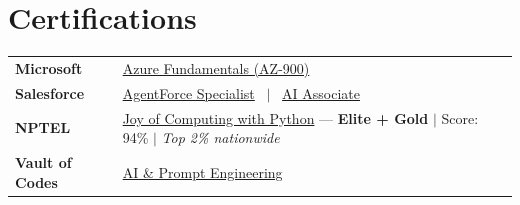 \documentclass[a4paper,10.5pt]{article}
\begin{document}
\section{Certifications}
\vspace{1pt}
\begin{tabularx}{\linewidth}{@{}l X@{}}
\textbf{Microsoft}      & \href{https://drive.google.com/file/d/1Uj9T80eRGSfT8G-HdICgMUi--92Ffz_9/view?usp=share_link}{Azure Fundamentals (AZ-900)} \\[2pt]
\textbf{Salesforce}     & \href{https://drive.google.com/file/d/1ig8ZAgni9Ml1-eQw-yYwkyeQZiyzHk-t/view?usp=share_link}{AgentForce Specialist} \ $|$ \ \href{https://drive.google.com/file/d/12eKyzIrdg2E9JL7Ei6M3PfhkW0PfKh1l/view?usp=sharing}{AI Associate} \\[2pt]
\textbf{NPTEL}          & \href{https://drive.google.com/file/d/1xy7yMiITQlHQ5rMfqnr1E25GgKLNywxe/view?usp=share_link}{Joy of Computing with Python} --- \textbf{Elite + Gold} $|$ Score: 94\% $|$ \textit{Top 2\% nationwide} \\[2pt]
\textbf{Vault of Codes} & \href{https://drive.google.com/file/d/1ZCG5hGw_KajViTB6CHOn3X3Br9BgI-SM/view?usp=share_link}{AI \& Prompt Engineering} \\
\end{tabularx}
\end{document}
